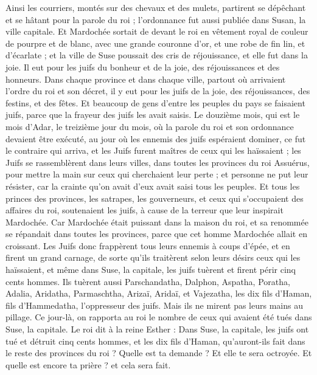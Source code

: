 \begin{multicols}{2}
Ainsi les courriers, montés sur des chevaux et des mulets, partirent se dépêchant et se hâtant pour la parole du roi ; l’ordonnance fut aussi publiée dans Susan, la ville capitale.
Et Mardochée sortait de devant le roi en vêtement royal de couleur de pourpre et de blanc, avec une grande couronne d’or, et une robe de fin lin, et d’écarlate ; et la ville de Suse poussait des cris de réjouissance, et elle fut dans la joie.
Il eut pour les juifs du bonheur et de la joie, des réjouissances et des honneurs.
Dans chaque province et dans chaque ville, partout où arrivaient l’ordre du roi et son décret, il y eut pour les juifs de la joie, des réjouissances, des festins, et des fêtes. Et beaucoup de gens d'entre les peuples du pays se faisaient juifs, parce que la frayeur des juifs les avait saisis.
\VerseOne{}Le douzième mois, qui est le mois d'Adar, le treizième jour du mois, où la parole du roi et son ordonnance devaient être exécuté, au jour où les ennemis des juifs espéraient dominer, ce fut le contraire qui arriva, et les Juifs furent maîtres de ceux qui les haïssaient ; 
les Juifs se rassemblèrent dans leurs villes, dans toutes les provinces du roi Assuérus, pour mettre la main sur ceux qui cherchaient leur perte ; et personne ne put leur résister, car la crainte qu'on avait d'eux avait saisi tous les peuples.
Et tous les princes des provinces, les satrapes, les gouverneurs, et ceux qui s’occupaient des affaires du roi, soutenaient les juifs, à cause de la terreur que leur inspirait Mardochée.
Car Mardochée était puissant dans la maison du roi, et sa renommée se répandait dans toutes les provinces, parce que cet homme Mardochée allait en croissant.
Les Juifs donc frappèrent tous leurs ennemis à coups d’épée, et en firent un grand carnage, de sorte qu’ils traitèrent selon leurs désirs ceux qui les haïssaient,
et même dans Suse, la capitale, les juifs tuèrent et firent périr cinq cents hommes.
Ils tuèrent aussi Parschandatha, Dalphon, Aspatha,
Poratha, Adalia, Aridatha,
Parmaschtha, Arizaï, Aridaï, et Vajezatha,
les dix fils d'Haman, fils d'Hammedatha, l'oppresseur des juifs. Mais ils ne mirent pas leurs mains au pillage.
Ce jour-là, on rapporta au roi le nombre de ceux qui avaient été tués dans Suse, la capitale.
Le roi dit à la reine Esther : Dans Suse, la capitale, les juifs ont tué et détruit cinq cents hommes, et les dix fils d'Haman, qu'auront-ils fait dans le reste des provinces du roi ? Quelle est ta demande ? Et elle te sera octroyée. Et quelle est encore ta prière ? et cela sera fait.

\end{multicols}
